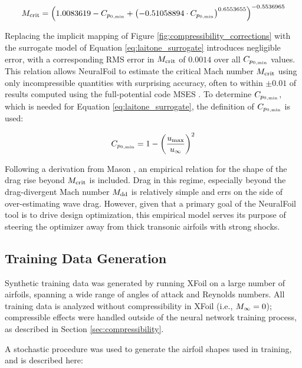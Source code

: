 \documentclass[conf]{new-aiaa}
\begin{document}
    \begin{equation}
        M_{\rm crit} = \left(
        1.0083619
        - C_{p_{0,\rm min}}
        + \left(-0.51058894 \cdot C_{p_{0,\rm min}} \right)^{0.6553655}
        \right)^{-0.5536965}
        \label{eq:laitone_surrogate}
    \end{equation}

    Replacing the implicit mapping of Figure \ref{fig:compressibility_corrections} with the surrogate model of Equation \ref{eq:laitone_surrogate} introduces negligible error, with a corresponding RMS error in $M_{\rm crit}$ of $0.0014$ over all $C_{p_{0,\rm min}}$ values. This relation allows NeuralFoil to estimate the critical Mach number $M_{\rm crit}$ using only incompressible quantities with surprising accuracy, often to within $\pm 0.01$ of results computed using the full-potential code MSES \cite{mses}. To determine $C_{p_{0,\rm min}}$, which is needed for Equation \ref{eq:laitone_surrogate}, the definition of $C_{p_{0,\rm min}}$ is used:

    \begin{equation}
        C_{p_{0,\rm min}} = 1 - \left( \frac{u_{\rm max}}{u_\infty} \right)^2
    \end{equation}

    Following a derivation from Mason \cite{mason_transonic_2006}, an empirical relation for the shape of the drag rise beyond $M_{\rm crit}$ is included. Drag in this regime, especially beyond the drag-divergent Mach number $M_{\rm dd}$ is relatively simple and errs on the side of over-estimating wave drag. However, given that a primary goal of the NeuralFoil tool is to drive design optimization, this empirical model serves its purpose of steering the optimizer away from thick transonic airfoils with strong shocks.

    \subsection{Training Data Generation}
    \label{sec:training-data}

    Synthetic training data was generated by running XFoil on a large number of airfoils, spanning a wide range of angles of attack and Reynolds numbers. All training data is analyzed without compressibility in XFoil (i.e., $M_\infty=0$); compressible effects were handled outside of the neural network training process, as described in Section \ref{sec:compressibility}.

    A stochastic procedure was used to generate the airfoil shapes used in training, and is described here:
\end{document}
